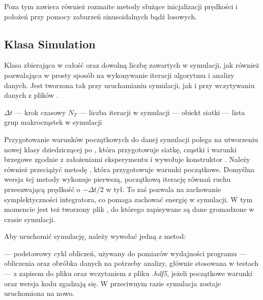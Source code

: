 Poza tym  zawiera również rozmaite metody służące inicjalizacji
prędkości i położeń przy pomocy zaburzeń sinusoidalnych bądź losowych.

\subsection{Klasa Simulation}
Klasa zbierająca w całość  oraz dowolną liczbę  zawartych w
symulacji, jak również pozwalająca w prosty sposób na wykonywanie iteracji
algorytmu i analizy danych. Jest tworzona tak przy uruchamianiu symulacji,
jak i przy wczytywaniu danych z plików .

\begin{itemize}
    \itemi{} $\Delta t$ --- krok czasowy
    \itemi{} $N_T$ --- liczba iteracji w symulacji
    \itemi{}  --- obiekt siatki
    \itemi{}  --- lista grup makrocząstek w symulacji
\end{itemize}

Przygotowanie warunków początkowych do danej symulacji polega na utworzeniu
nowej klasy dziedziczącej po , która przygotowuje siatkę,
cząstki i warunki brzegowe zgodnie z założeniami eksperymentu i wywołuje
konstruktor .  Należy również przeciążyć metodę
, która przygotowuje warunki początkowe.
Domyślna wersja tej metody wykonuje pierwszą, początkową iterację równań ruchu
przesuwającą prędkość o $-\Delta t / 2$ w tył. To zaś pozwala na zachowanie
symplektyczności integratora, co pomaga zachować energię w symulacji.  W tym
momencie jest też tworzony plik , do którego zapisywane są dane
gromadzone w czasie symulacji.

Aby uruchomić symulację, należy wywołać jedną z metod:
\begin{itemize}
     \itemi{}  --- podstawowy cykl obliczeń, używany do pomiarów
         wydajności programu
     \itemi{}  --- obliczenia oraz obróbka danych na potrzeby
         analizy, głównie stosowana w testach
     \itemi{}  ---  z zapisem do pliku oraz
         wczytaniem z pliku \emph{.hdf5}, jeżeli początkowe warunki oraz
         wersja kodu zgadzają się. W przeciwnym razie symulacja zostaje
         uruchomiona na nowo.
\end{itemize}

